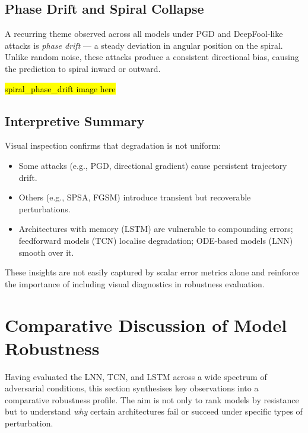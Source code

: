 \subsection{Phase Drift and Spiral Collapse}

A recurring theme observed across all models under PGD and DeepFool-like attacks is \emph{phase drift} — a steady deviation in angular position on the spiral. Unlike random noise, these attacks produce a consistent directional bias, causing the prediction to spiral inward or outward.

\hl{spiral\_phase\_drift image here}


\subsection{Interpretive Summary}

Visual inspection confirms that degradation is not uniform:
\begin{itemize}
    \item Some attacks (e.g., PGD, directional gradient) cause persistent trajectory drift.
    \item Others (e.g., SPSA, FGSM) introduce transient but recoverable perturbations.
    \item Architectures with memory (LSTM) are vulnerable to compounding errors; feedforward models (TCN) localise degradation; ODE-based models (LNN) smooth over it.
\end{itemize}

These insights are not easily captured by scalar error metrics alone and reinforce the importance of including visual diagnostics in robustness evaluation.

\section{Comparative Discussion of Model Robustness}

Having evaluated the LNN, TCN, and LSTM across a wide spectrum of adversarial conditions, this section synthesises key observations into a comparative robustness profile. The aim is not only to rank models by resistance but to understand \emph{why} certain architectures fail or succeed under specific types of perturbation.

